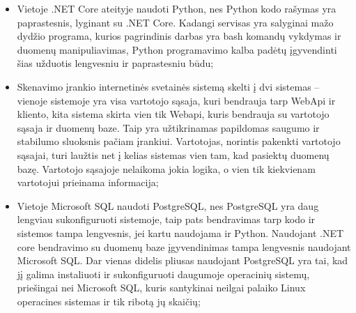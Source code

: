 \begin{itemize}
	\item Vietoje .NET Core ateityje naudoti Python, nes Python kodo rašymas yra paprastesnis, lyginant su .NET Core. Kadangi servisas yra salyginai mažo dydžio programa, kurios pagrindinis darbas yra bash komandų vykdymas ir duomenų manipuliavimas, Python programavimo kalba padėtų įgyvendinti šias užduotis lengvesniu ir paprastesniu būdu;
	\item Skenavimo įrankio internetinės svetainės sistemą skelti į dvi sistemas – vienoje sistemoje yra visa vartotojo sąsaja, kuri bendrauja tarp WebApi ir kliento, kita sistema skirta vien tik Webapi, kuris bendrauja su vartotojo sąsaja ir duomenų baze. Taip yra užtikrinamas papildomas saugumo ir stabilumo sluoksnis pačiam įrankiui. Vartotojas, norintis pakenkti vartotojo sąsajai, turi laužtis net į kelias sistemas vien tam, kad pasiektų duomenų bazę. Vartotojo sąsajoje nelaikoma jokia logika, o vien tik kiekvienam vartotojui prieinama informacija;
	\item Vietoje Microsoft SQL naudoti PostgreSQL, nes PostgreSQL yra daug lengviau sukonfiguruoti sistemoje, taip pats bendravimas tarp kodo ir sistemos tampa lengvesnis, jei kartu naudojama ir Python. Naudojant .NET core bendravimo su duomenų baze įgyvendinimas tampa lengvesnis naudojant Microsoft SQL. Dar vienas didelis pliusas naudojant PostgreSQL yra tai, kad jį galima instaliuoti ir sukonfiguruoti daugumoje operacinių sistemų, priešingai nei Microsoft SQL, kuris santykinai neilgai palaiko Linux operacines sistemas ir tik ribotą jų skaičių;{\tiny }
\end{itemize}















